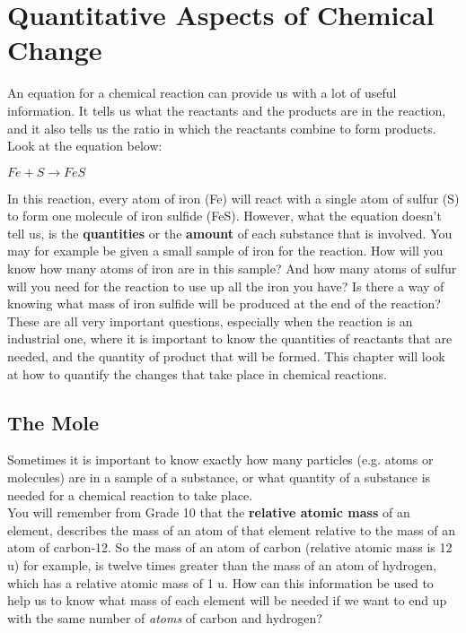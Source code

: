 \chapter{Quantitative Aspects of Chemical Change}
\label{chap:quant}

An equation for a chemical reaction can provide us with a lot of useful information. It tells us what the reactants and the products are in the reaction, and it also tells us the ratio in which the reactants combine to form products. Look at the equation below:

\begin{center}
\rm${Fe + S \rightarrow FeS}$\\
\end{center}

In this reaction, every atom of iron (Fe) will react with a single atom of sulfur (S) to form one molecule of iron sulfide (FeS). However, what the equation doesn't tell us, is the \textbf{quantities} or the \textbf{amount} of each substance that is involved. You may for example be given a small sample of iron for the reaction. How will you know how many atoms of iron are in this sample? And how many atoms of sulfur will you need for the reaction to use up all the iron you have? Is there a way of knowing what mass of iron sulfide will be produced at the end of the reaction? These are all very important questions, especially when the reaction is an industrial one, where it is important to know the quantities of reactants that are needed, and the quantity of product that will be formed. This chapter will look at how to quantify the changes that take place in chemical reactions.




\section{The Mole}
\label{sec:quant:mole}

Sometimes it is important to know exactly how many particles (e.g. atoms or molecules) are in a sample of a substance, or what quantity of a substance is needed for a chemical reaction to take place.\\

You will remember from Grade 10 that the \textbf{relative atomic mass} of an element, describes the mass of an atom of that element relative to the mass of an atom of carbon-12. So the mass of an atom of carbon (relative atomic mass is 12 u) for example, is twelve times greater than the mass of an atom of hydrogen, which has a relative atomic mass of 1 u. How can this information be used to help us to know what mass of each element will be needed if we want to end up with the same number of \textit{atoms} of carbon and hydrogen?\\

